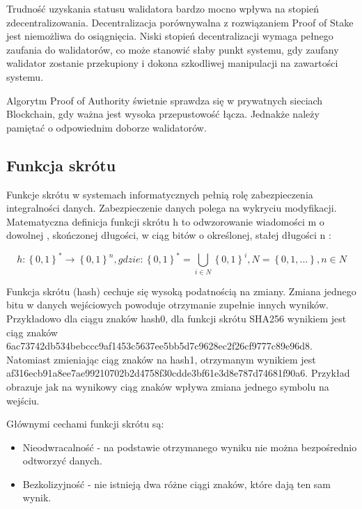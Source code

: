 \documentclass[a4paper,12pt]{book}
\begin{document}
Trudność uzyskania statusu walidatora bardzo mocno wpływa na stopień zdecentralizowania. Decentralizacja porównywalna z rozwiązaniem Proof of Stake jest niemożliwa do osiągnięcia.
Niski stopień decentralizacji wymaga pełnego zaufania do walidatorów, co może stanowić słaby punkt systemu, gdy zaufany walidator zostanie przekupiony i dokona szkodliwej manipulacji na zawartości systemu.

Algorytm Proof of Authority świetnie sprawdza się w prywatnych sieciach Blockchain, gdy ważna jest wysoka przepustowość łącza. Jednakże należy pamiętać o odpowiednim doborze walidatorów.

\subsection{Funkcja skrótu}

Funkcje skrótu w systemach informatycznych pełnią rolę zabezpieczenia integralności danych. Zabezpieczenie danych polega na wykryciu modyfikacji. Matematyczna definicja funkcji skrótu h to odwzorowanie wiadomości m o dowolnej , skończonej długości, w ciąg bitów o określonej, stałej długości n \cite{hash}:

\begin{equation}
h:\left \{0, 1\right \}^{*}\rightarrow \left \{0, 1\right \}^{n}, gdzie: \left \{0, 1\right \}^{*}=\bigcup_{i\in  N}\left \{0, 1\right \}^{i}, N = \left \{0, 1, ...\right \}, n \in N
\end{equation}

Funkcja skrótu (hash) cechuje się wysoką podatnością na zmiany. Zmiana jednego bitu w danych wejściowych powoduje otrzymanie zupełnie innych wyników. \newline
Przykładowo dla ciągu znaków hash0, dla funkcji skrótu SHA256 wynikiem jest ciąg znaków
\newline 6ac73742db534bebccc9af1453c5637ee5bb5d7c9628ec2f26cf9777c89e96d8. Natomiast zmieniając ciąg znaków na hash1, otrzymanym wynikiem jest \newline af316ecb91a8ee7ae99210702b2d4758f30cdde3bf61e3d8e787d74681f90a6. Przykład obrazuje jak na wynikowy ciąg znaków wpływa zmiana jednego symbolu na wejściu.

Głównymi cechami funkcji skrótu są:
\begin{itemize}
	\item Nieodwracalność - na podstawie otrzymanego wyniku nie można bezpośrednio odtworzyć danych.
	\item Bezkolizyjność - nie istnieją dwa różne ciągi znaków, które dają ten sam wynik.
\end{itemize}
\end{document}
